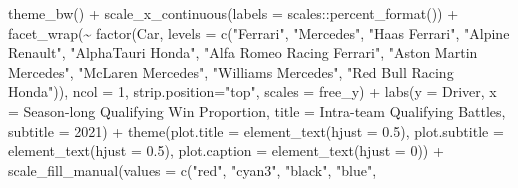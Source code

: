 \documentclass[
]{book}
\newenvironment{Shaded}{\begin{snugshade}}{\end{snugshade}}
\newcommand{\AttributeTok}[1]{\textcolor[rgb]{0.77,0.63,0.00}{#1}}
\newcommand{\DecValTok}[1]{\textcolor[rgb]{0.00,0.00,0.81}{#1}}
\newcommand{\FloatTok}[1]{\textcolor[rgb]{0.00,0.00,0.81}{#1}}
\newcommand{\FunctionTok}[1]{\textcolor[rgb]{0.00,0.00,0.00}{#1}}
\newcommand{\NormalTok}[1]{#1}
\newcommand{\SpecialCharTok}[1]{\textcolor[rgb]{0.00,0.00,0.00}{#1}}
\newcommand{\StringTok}[1]{\textcolor[rgb]{0.31,0.60,0.02}{#1}}
\begin{document}
\begin{Shaded}
\begin{Highlighting}[]
  \FunctionTok{theme\_bw}\NormalTok{() }\SpecialCharTok{+}
  \FunctionTok{scale\_x\_continuous}\NormalTok{(}\AttributeTok{labels =}\NormalTok{ scales}\SpecialCharTok{::}\FunctionTok{percent\_format}\NormalTok{()) }\SpecialCharTok{+}
  \FunctionTok{facet\_wrap}\NormalTok{(}\SpecialCharTok{\textasciitilde{}} \FunctionTok{factor}\NormalTok{(Car,}
                      \AttributeTok{levels =} \FunctionTok{c}\NormalTok{(}\StringTok{"Ferrari"}\NormalTok{,}
                                 \StringTok{"Mercedes"}\NormalTok{,}
                                 \StringTok{"Haas Ferrari"}\NormalTok{,}
                                 \StringTok{"Alpine Renault"}\NormalTok{,}
                                 \StringTok{"AlphaTauri Honda"}\NormalTok{,}
                                 \StringTok{"Alfa Romeo Racing Ferrari"}\NormalTok{, }
                                 \StringTok{"Aston Martin Mercedes"}\NormalTok{,}
                                 \StringTok{"McLaren Mercedes"}\NormalTok{,}
                                 \StringTok{"Williams Mercedes"}\NormalTok{,}
                                 \StringTok{"Red Bull Racing Honda"}\NormalTok{)), }\AttributeTok{ncol =} \DecValTok{1}\NormalTok{, }\AttributeTok{strip.position=}\StringTok{"top"}\NormalTok{, }\AttributeTok{scales =} \StringTok{\textquotesingle{}free\_y\textquotesingle{}}\NormalTok{) }\SpecialCharTok{+}
  \FunctionTok{labs}\NormalTok{(}\AttributeTok{y =} \StringTok{\textquotesingle{}Driver\textquotesingle{}}\NormalTok{,}
       \AttributeTok{x =} \StringTok{\textquotesingle{}Season{-}long Qualifying Win Proportion\textquotesingle{}}\NormalTok{,}
       \AttributeTok{title =} \StringTok{\textquotesingle{}Intra{-}team Qualifying Battles\textquotesingle{}}\NormalTok{,}
       \AttributeTok{subtitle =} \StringTok{\textquotesingle{}2021\textquotesingle{}}\NormalTok{) }\SpecialCharTok{+}
  \FunctionTok{theme}\NormalTok{(}\AttributeTok{plot.title =} \FunctionTok{element\_text}\NormalTok{(}\AttributeTok{hjust =} \FloatTok{0.5}\NormalTok{),}
        \AttributeTok{plot.subtitle =} \FunctionTok{element\_text}\NormalTok{(}\AttributeTok{hjust =} \FloatTok{0.5}\NormalTok{),}
        \AttributeTok{plot.caption =} \FunctionTok{element\_text}\NormalTok{(}\AttributeTok{hjust =} \DecValTok{0}\NormalTok{)) }\SpecialCharTok{+}
  \FunctionTok{scale\_fill\_manual}\NormalTok{(}\AttributeTok{values =} \FunctionTok{c}\NormalTok{(}\StringTok{"red"}\NormalTok{, }
                                \StringTok{"cyan3"}\NormalTok{,  }
                                \StringTok{"black"}\NormalTok{, }
                                \StringTok{"blue"}\NormalTok{,}

\end{Highlighting}
\end{Shaded}
\end{document}
